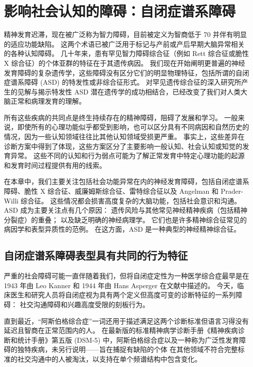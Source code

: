 \chapter{影响社会认知的障碍：自闭症谱系障碍} \label{chap:chap62}

精神发育迟滞，现在被广泛称为智力障碍，目前被定义为智商低于 70 并伴有明显的适应功能缺陷。
这两个术语已被广泛用于标记与产前或产后早期大脑异常相关的各种认知障碍。
几十年来，患有罕见智力障碍综合征（例如 Rett 综合征或脆性 X 综合征）的个体亚群的特征在于其遗传病因。
我们现在开始阐明更普遍的神经发育障碍的复杂遗传学，这些障碍没有区分它们的明显物理特征，包括所谓的自闭症谱系障碍 (ASD) 的特发性或非综合征形式。
对罕见遗传综合征的深入研究所产生的见解与揭示特发性 ASD 潜在遗传学的成功相结合，已经改变了我们对人类大脑正常和病理发育的理解。


所有这些疾病的共同点是终生持续存在的精神障碍，阻碍了发展和学习。
一般来说，即使所有的心理功能似乎都受到影响，也可以区分具有不同病因和自然历史的情况，因为一些认知领域往往比其他认知领域受损更严重。
事实上，这些差异在诊断方案中得到了体现，这些方案区分了主要影响一般认知、社会认知或知觉的发育异常。
这些不同的认知和行为弱点可能为了解正常发育中特定心理功能的起源和发育时间过程提供有用的线索。


在本章中，我们主要关注包括社会功能异常在内的神经发育障碍，包括自闭症谱系障碍、脆性 X 综合征、威廉姆斯综合征、雷特综合征以及 Angelman 和 Prader-Willi 综合征。
这些情况都会损害高度复杂的大脑功能，包括社会意识和沟通。
ASD 成为主要关注点有几个原因：
遗传风险与其他常见神经精神疾病（包括精神分裂症）的重叠；
以及缺乏明确的神经病理学。
它们也是许多精神综合征常见的病因学和表型异质性的范例。
在这方面，ASD 是一种典型的神经精神综合征。



\section{自闭症谱系障碍表型具有共同的行为特征}

严重的社会障碍可能一直伴随着我们，但将自闭症定性为一种医学综合症最早是在 1943 年由 Leo Kanner 和 1944 年由 Hans Asperger 在文献中描述的。
今天，临床医生和研究人员将自闭症视为具有两个定义但高度可变的诊断特征的一系列障碍：
社交沟通障碍和兴趣高度受限的刻板行为。


直到最近，“阿斯伯格综合症”一词还用于描述满足这两个诊断标准但语言习得没有延迟且智商在正常范围内的人。
在最新版的标准精神病学诊断手册《精神疾病诊断和统计手册》第五版 (DSM-5) 中，阿斯伯格综合症以及一种称为广泛性发育障碍的独特疾病，未另行说明——旨在捕捉有缺陷的个体 在其他领域不符合完整标准的社交沟通中的人被淘汰，以支持在单个频谱结构中包含变化。


